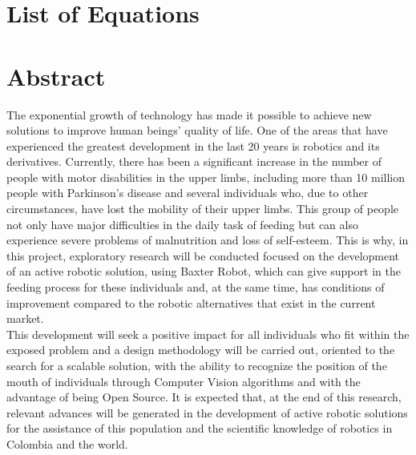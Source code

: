 \documentclass[11pt]{report} %
\begin{document}
\tableofcontents




\cleardoublepage
\listoffigures


\cleardoublepage
\listoftables


\cleardoublepage
\chapter*{List of Equations}

\listofmyequations


\chapter*{Abstract}


The exponential growth of technology has made it possible to achieve new solutions to improve human beings' quality of life. One of the areas that have experienced the greatest development in the last 20 years is robotics and its derivatives. Currently, there has been a significant increase in the number of people with motor disabilities in the upper limbs, including more than 10 million people with Parkinson's disease and several individuals who, due to other circumstances, have lost the mobility of their upper limbs. This group of people not only have major difficulties in the daily task of feeding but can also experience severe problems of malnutrition and loss of self-esteem. This is why, in this project, exploratory research will be conducted focused on the development of an active robotic solution, using Baxter Robot, which can give support in the feeding process for these individuals and, at the same time, has conditions of improvement compared to the robotic alternatives that exist in the current market.\\

This development will seek a positive impact for all individuals who fit within the exposed problem and a design methodology will be carried out, oriented to the search for a scalable solution, with the ability to recognize the position of the mouth of individuals through Computer Vision algorithms and with the advantage of being Open Source. It is expected that, at the end of this research, relevant advances will be generated in the development of active robotic solutions for the assistance of this population and the scientific knowledge of robotics in Colombia and the world.\\
\end{document}
